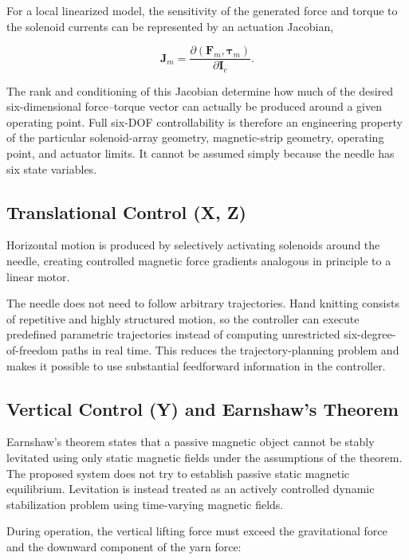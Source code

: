 \documentclass[12pt, a4paper]{article}
\begin{document}
For a local linearized model, the sensitivity of the generated force and torque to the solenoid currents can be represented by an actuation Jacobian,

\begin{equation}
\mathbf{J}_m=
\frac{\partial(\mathbf{F}_m,\boldsymbol{\tau}_m)}
{\partial \mathbf{I}_c}.
\end{equation}

The rank and conditioning of this Jacobian determine how much of the desired six-dimensional force--torque vector can actually be produced around a given operating point. Full six-DOF controllability is therefore an engineering property of the particular solenoid-array geometry, magnetic-strip geometry, operating point, and actuator limits. It cannot be assumed simply because the needle has six state variables.

\subsection{Translational Control (X, Z)}

Horizontal motion is produced by selectively activating solenoids around the needle, creating controlled magnetic force gradients analogous in principle to a linear motor.

The needle does not need to follow arbitrary trajectories. Hand knitting consists of repetitive and highly structured motion, so the controller can execute predefined parametric trajectories instead of computing unrestricted six-degree-of-freedom paths in real time. This reduces the trajectory-planning problem and makes it possible to use substantial feedforward information in the controller.

\subsection{Vertical Control (Y) and Earnshaw's Theorem}

Earnshaw's theorem states that a passive magnetic object cannot be stably levitated using only static magnetic fields under the assumptions of the theorem. The proposed system does not try to establish passive static magnetic equilibrium. Levitation is instead treated as an actively controlled dynamic stabilization problem using time-varying magnetic fields.

During operation, the vertical lifting force must exceed the gravitational force and the downward component of the yarn force:
\end{document}
